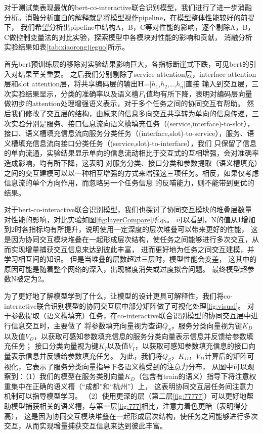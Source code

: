 对于测试集表现最优的bert-co-interactive联合识别模型，我们进行了进一步消融分析。消融分析直白的解释就是将模型视作pipeline，在模型整体性能较好的前提下，
我们希望分析出pipeline中结构A，B，C等对性能的影响，逐个剔除A，B，C做控制变量法的对比实验，探索模型中各模块对性能的影响和贡献，
消融分析实验结果如表\ref{tab:xiaorongjieguo}所示。

首先bert预训练层的移除对实验结果影响巨大，各指标断崖式下跌，可见bert的引入对结果至关重要。
之后我们分别剔除了service attention层，interface attention层和slot attention层，将共享编码层的输出$\mathbf{H}$=[$h_{1}$,$h_{2}$,\dots,$h_{n}$]直接
输入到交互层，三次实验结果显示，分类的准确率以及语义槽$F_1$值均有所下降，表明对编码层向量做初步的attention处理增强语义表示，对于多个任务之间的协同交互有帮助。
然后我们修改了交互层的结构，由原来的信息多向交互共享转为单向的信息传递，三次实验分别是服务、接口信息流向语义槽填充任务（(service,interface)-to-slot），
接口、语义槽填充信息流向服务分类任务（(interface,slot)-to-service），服务、语义槽填充信息流向接口分类任务（(service,slot)-to-interface），我们
只保留了信息的单向流通，实验结果显示单向的信息流动相比于交互式的互相增强，会对准确率造成影响，均有所下降，这表明
对服务分类、接口分类和参数提取（语义槽填充）之间的交互建模可以以一种相互增强的方式来增强这三项任务。相反，如果仅考虑信息流的单个方向作用，而忽略另一个任务信息
的反哺能力，则不能带到更优的结果。


对于bert-co-interactive联合识别模型，我们也探讨了协同交互模块的堆叠层数量对性能的影响，对比实验如图\ref{fig:layerCompare}所示。
可以看到，N的值从1增加到2时各指标均有所提升，说明使用一定深度的层次堆叠可以带来更好的性能，
这是因为协同交互模块堆叠在一起形成层次结构，使任务之间能够进行多次交互，从而实现增量捕获交互信息来达到彼此丰富，
进而更好地为任务之间交互建模，并学习相互间的知识。 
但是当堆叠的层数超过三层时，模型性能会变差，
这其中的原因可能是随着整个网络的深入，出现梯度消失或过度拟合问题。
最终模型超参数N被定为2。

  为了更好地了解模型学到了什么，让模型的设计更具可解释性，我们将co-interactive联合识别模型的协同交互层中部分矩阵做了可视化处理\ref{fig:visual}。
  对于参数提取（语义槽填充）任务，在co-interactive联合识别模型的协同交互层中进行信息交互时，主要做了
  将参数填充向量视为查询$Q_S$，服务分类向量视为键$K_D$以及值$V_D$，以获取可感知参数填充信息的服务分类向量表示信息并反馈给参数填充任务；
接口分类向量视为键$K_I$以及值$V_I$，以获取可感知参数填充信息的接口向量表示信息并反馈给参数填充任务。
  为此，我们将$Q_S$，$K_D$，$V_D$计算后的矩阵可视化，它表示了服务分类向量指导下各语义槽受到的注意力分布，
  从图中可以观察到：（1）我们的模型在服务类别向量$K_D$（包含有train的语义）指导下将注意权重集中在正确的语义槽（“成都”和“杭州”）上，
  这表明协同交互层任务间注意力机制可以指导模型学习。
  （2）使用更深的层（第二层\ref{fig:77777}）可以更好地帮助模型捕获相关的语义槽，与第一层\ref{fig:777}相比，注意力着色更暗（表明得分高），
  这是因为协同交互模块堆叠在一起形成层次结构，使任务之间能够进行多次交互，从而实现增量捕获交互信息来达到彼此丰富。

